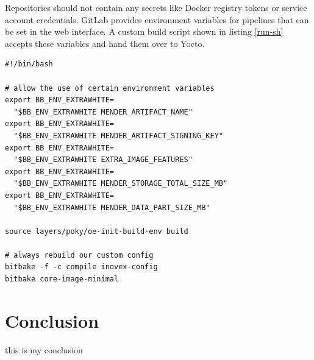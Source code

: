 Repositories should not contain any secrets like Docker registry tokens or service account credentials. GitLab provides environment variables for pipelines that can be set in the web interface. A custom build script shown in listing \ref{run-sh} accepts these variables and hand them over to Yocto.
\begin{code}
  \label{run-sh}
  \begin{verbatim}
#!/bin/bash

# allow the use of certain environment variables
export BB_ENV_EXTRAWHITE=
  "$BB_ENV_EXTRAWHITE MENDER_ARTIFACT_NAME"
export BB_ENV_EXTRAWHITE=
  "$BB_ENV_EXTRAWHITE MENDER_ARTIFACT_SIGNING_KEY"
export BB_ENV_EXTRAWHITE=
  "$BB_ENV_EXTRAWHITE EXTRA_IMAGE_FEATURES"
export BB_ENV_EXTRAWHITE=
  "$BB_ENV_EXTRAWHITE MENDER_STORAGE_TOTAL_SIZE_MB"
export BB_ENV_EXTRAWHITE=
  "$BB_ENV_EXTRAWHITE MENDER_DATA_PART_SIZE_MB"

source layers/poky/oe-init-build-env build

# always rebuild our custom config
bitbake -f -c compile inovex-config
bitbake core-image-minimal
  \end{verbatim}
\end{code}

\newpage

\section{Conclusion}
this is my conclusion

\newpage
